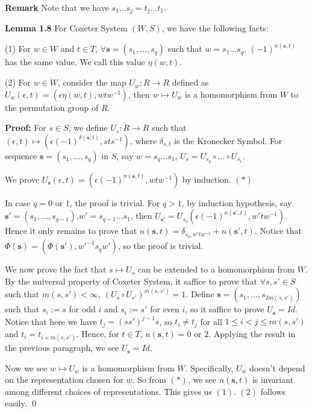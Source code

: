 \noindent \textbf{Remark}
    Note that we have $s_1...s_j=t_j...t_1$.


\vspace{\baselineskip}
\noindent \textbf{Lemma 1.8}  For Coxeter System $(W,S)$, we have the following facts:

\indent (1) For $w \in W$ and $t \in T$, $\forall \mathbf{s}=(s_1,...,s_q)$ such that $w=s_1...s_q$, $(-1)^{n(\mathbf{s},t)}$ has the same value. We call this value $\eta(w,t)$.

\indent (2) For $w \in W$, consider the map $U_w:R \rightarrow R$ defined as $U_w(\epsilon,t)=(\epsilon \eta (w,t),wtw^{-1})$, then $w \mapsto U_w$ is a homomorphism from $W$ to the permutation group of $R$. 

\vspace{0.5\baselineskip}
\noindent \textbf{Proof:} For $s \in S$, we define $U_s:R \rightarrow R$ such that $(\epsilon,t) \mapsto (\epsilon(-1)^{\delta(\mathbf{s},t)},sts^{-1})$, where $\delta_{s,t}$ is the Kronecker Symbol. For sequence $\mathbf{s}=(s_1,...,s_q)$ in $S$, say $w=s_q...s_1$, $U_s=U_{s_q}\circ...\circ U_{s_1}$.

 We prove $U_{\mathbf{s}}(\epsilon,t)=(\epsilon(-1)^{n(\mathbf{s},t)},wtw^{-1})$ by induction. $(*)$

 In case $q=0$ or $1$, the proof is trivial. For $q >1$, by induction hypothesis, say $\mathbf{s'}=(s_1,...,s_{q-1})$,$w'=s_{q-1}...s_1$, then $U_{\mathbf{s'}}=U_{s_q}(\epsilon(-1)^{n(\mathbf{s'},t)},w'tw^{-1})$. Hence it only remains to prove that $n(\mathbf{s},t)=\delta_{s_q,w'tw^{-1}}+n(\mathbf{s'},t)$. Notice that $\Phi(\mathbf{s})=(\Phi(\mathbf{s'}),w'^{-1}s_qw')$, so the proof is trivial.

 We now prove the fact that $s\mapsto U_s$ can be extended to a homomorphism from $W$. By the universal property of Coxeter System, it saffice to prove that $\forall s,s' \in S$ such that $m(s,s') < \infty$, $(U_s \circ U_{s'})^{m(s,s')}=1$. Define $\mathbf{s}=(s_1,...,s_{2m(s,s')})$ such that $s_i:=s$ for odd $i$ and $s_i:=s'$ for even $i$, so it saffice to prove $U_{\mathbf{s}}=Id$. Notice that here we have $t_j=(ss')^{j-1}s$, so $t_i \ne t_j$ for all $1\le i<j \le m(s,s')$ and $t_i=t_{i+m(s,s')}$. Hence, for $t \in T$, $n(\mathbf{s},t)=0$ or $2$. Applying the result in the previous paragraph, we see $U_{\mathbf{s}}=Id$. 

 Now we see $w\mapsto U_w$ is a homomorphism from $W$. Specifically, $U_w$ doesn't depend on the representation chosen for $w$. So from $(*)$, we see $n(\mathbf{s},t)$ is invariant among different choices of representations. This gives us $(1)$. $(2)$ follows easily. \qed

